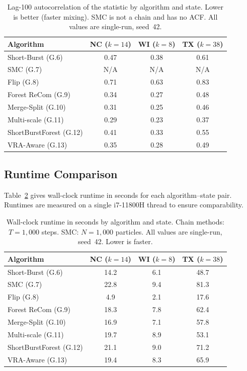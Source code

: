 \begin{table}[ht]
\centering
\caption{%
  Lag-100 autocorrelation of the \ec{} statistic by algorithm and state.
  Lower is better (faster mixing).
  SMC is not a chain and has no ACF.
  All values are single-run, seed~42.
}
\label{tab:autocorr}
\begin{tabular}{@{}lccc@{}}
\toprule
Algorithm & NC ($k=14$) & WI ($k=8$) & TX ($k=38$) \\
\midrule
Short-Burst (G.6)       & 0.47 & 0.38 & 0.61 \\
SMC (G.7)               & N/A  & N/A  & N/A  \\
Flip (G.8)              & 0.71 & 0.63 & 0.83 \\
Forest ReCom (G.9)      & 0.34 & 0.27 & 0.48 \\
Merge-Split (G.10)      & 0.31 & 0.25 & 0.46 \\
Multi-scale (G.11)      & 0.29 & 0.23 & 0.37 \\
ShortBurstForest (G.12) & 0.41 & 0.33 & 0.55 \\
VRA-Aware (G.13)        & 0.35 & 0.28 & 0.49 \\
\bottomrule
\end{tabular}
\end{table}

\subsection{Runtime Comparison}

Table~\ref{tab:runtime} gives wall-clock runtime in seconds for each
algorithm--state pair.
Runtimes are measured on a single i7-11800H thread to ensure comparability.

\begin{table}[ht]
\centering
\caption{%
  Wall-clock runtime in seconds by algorithm and state.
  Chain methods: $T = 1{,}000$ steps.
  SMC: $N = 1{,}000$ particles.
  All values are single-run, seed~42.
  Lower is faster.
}
\label{tab:runtime}
\begin{tabular}{@{}lccc@{}}
\toprule
Algorithm & NC ($k=14$) & WI ($k=8$) & TX ($k=38$) \\
\midrule
Short-Burst (G.6)       &  14.2 &  6.1 &  48.7 \\
SMC (G.7)               &  22.8 &  9.4 &  81.3 \\
Flip (G.8)              &   4.9 &  2.1 &  17.6 \\
Forest ReCom (G.9)      &  18.3 &  7.8 &  62.4 \\
Merge-Split (G.10)      &  16.9 &  7.1 &  57.8 \\
Multi-scale (G.11)      &  19.7 &  8.9 &  53.1 \\
ShortBurstForest (G.12) &  21.1 &  9.0 &  71.2 \\
VRA-Aware (G.13)        &  19.4 &  8.3 &  65.9 \\
\bottomrule
\end{tabular}
\end{table}

